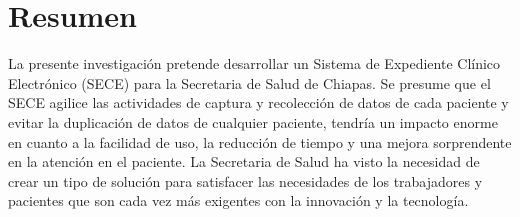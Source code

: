 \chapter*{Resumen}
La presente investigación pretende desarrollar un Sistema de Expediente Clínico Electrónico (SECE) para la Secretaria de Salud de Chiapas. Se presume que el SECE agilice las actividades de captura y recolección de datos de cada paciente y evitar la duplicación de datos de cualquier paciente, tendría un impacto enorme en cuanto a la facilidad de uso, la reducción de tiempo y una mejora sorprendente en la atención en el paciente. La Secretaria de Salud ha visto la necesidad de crear un tipo de solución para satisfacer las necesidades de los trabajadores y pacientes que son cada vez más exigentes con la innovación y la tecnología.
